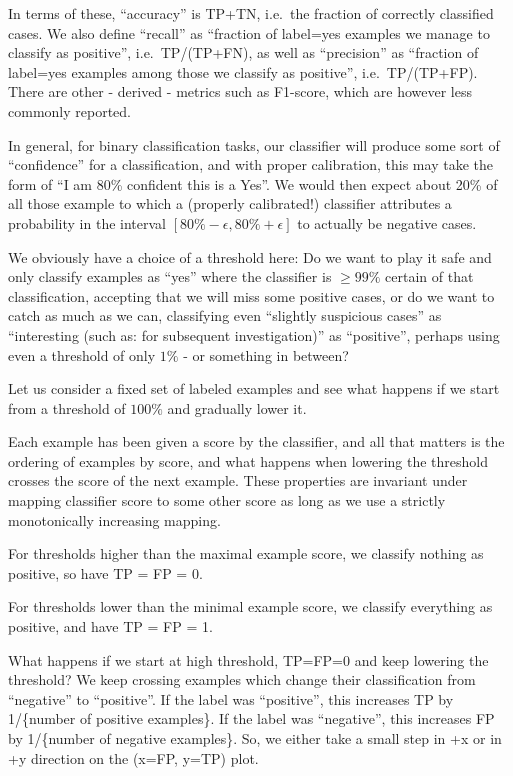 \documentclass[11pt]{article}
\begin{document}
In terms of these, ``accuracy'' is TP+TN, i.e.~the fraction of correctly
classified cases. We also define ``recall'' as ``fraction of label=yes
examples we manage to classify as positive'', i.e.~TP/(TP+FN), as well
as ``precision'' as ``fraction of label=yes examples among those we
classify as positive'', i.e.~TP/(TP+FP). There are other - derived -
metrics such as F1-score, which are however less commonly reported.

In general, for binary classification tasks, our classifier will produce
some sort of ``confidence'' for a classification, and with proper
calibration, this may take the form of ``I am 80\% confident this is a
Yes''. We would then expect about 20\% of all those example to which a
(properly calibrated!) classifier attributes a probability in the
interval \([80\%-\epsilon, 80\%+\epsilon]\) to actually be negative
cases.

We obviously have a choice of a threshold here: Do we want to play it
safe and only classify examples as ``yes'' where the classifier is
\(\ge 99\%\) certain of that classification, accepting that we will miss
some positive cases, or do we want to catch as much as we can,
classifying even ``slightly suspicious cases'' as ``interesting (such
as: for subsequent investigation)'' as ``positive'', perhaps using even
a threshold of only \(1\%\) - or something in between?

Let us consider a fixed set of labeled examples and see what happens if
we start from a threshold of \(100\%\) and gradually lower it.

Each example has been given a score by the classifier, and all that
matters is the ordering of examples by score, and what happens when
lowering the threshold crosses the score of the next example. These
properties are invariant under mapping classifier score to some other
score as long as we use a strictly monotonically increasing mapping.

For thresholds higher than the maximal example score, we classify
nothing as positive, so have TP = FP = 0.

For thresholds lower than the minimal example score, we classify
everything as positive, and have TP = FP = 1.

What happens if we start at high threshold, TP=FP=0 and keep lowering
the threshold? We keep crossing examples which change their
classification from ``negative'' to ``positive''. If the label was
``positive'', this increases TP by 1/\{number of positive examples\}. If
the label was ``negative'', this increases FP by 1/\{number of negative
examples\}. So, we either take a small step in +x or in +y direction on
the (x=FP, y=TP) plot.
\end{document}

